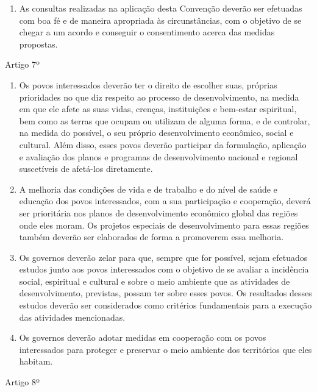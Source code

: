 \documentclass[
]{book}
\providecommand{\tightlist}{%
  \setlength{\itemsep}{0pt}\setlength{\parskip}{0pt}}
\begin{document}
\begin{enumerate}
\def\labelenumi{\arabic{enumi}.}
\setcounter{enumi}{1}
\tightlist
\item
  As consultas realizadas na aplicação desta Convenção deverão ser efetuadas com boa fé e de maneira apropriada às circunstâncias, com o objetivo de se chegar a um acordo e conseguir o consentimento acerca das medidas propostas.
\end{enumerate}

Artigo 7º

\begin{enumerate}
\def\labelenumi{\arabic{enumi}.}
\item
  Os povos interessados deverão ter o direito de escolher suas, próprias prioridades no que diz respeito ao processo de desenvolvimento, na medida em que ele afete as suas vidas, crenças, instituições e bem-estar espiritual, bem como as terras que ocupam ou utilizam de alguma forma, e de controlar, na medida do possível, o seu próprio desenvolvimento econômico, social e cultural. Além disso, esses povos deverão participar da formulação, aplicação e avaliação dos planos e programas de desenvolvimento nacional e regional suscetíveis de afetá-los diretamente.
\item
  A melhoria das condições de vida e de trabalho e do nível de saúde e educação dos povos interessados, com a sua participação e cooperação, deverá ser prioritária nos planos de desenvolvimento econômico global das regiões onde eles moram. Os projetos especiais de desenvolvimento para essas regiões também deverão ser elaborados de forma a promoverem essa melhoria.
\item
  Os governos deverão zelar para que, sempre que for possível, sejam efetuados estudos junto aos povos interessados com o objetivo de se avaliar a incidência social, espiritual e cultural e sobre o meio ambiente que as atividades de desenvolvimento, previstas, possam ter sobre esses povos. Os resultados desses estudos deverão ser considerados como critérios fundamentais para a execução das atividades mencionadas.
\item
  Os governos deverão adotar medidas em cooperação com os povos interessados para proteger e preservar o meio ambiente dos territórios que eles habitam.
\end{enumerate}

Artigo 8º
\end{document}
